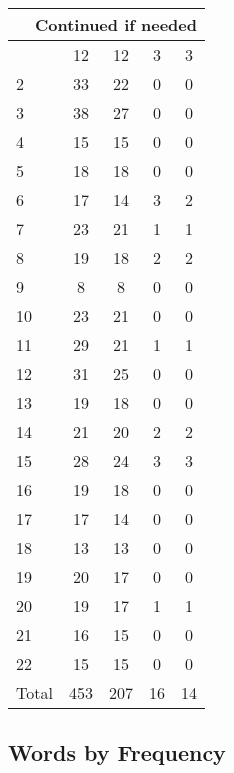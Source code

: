 \begin{center}
\begin{longtable}{l|c|c|c|c}
\hline \multicolumn{5}{|r|}{{Continued if needed}} \\ \hline
\endfoot 
1 & 12 & 12 & 3 & 3\\ \hline
2 & 33 & 22 & 0 & 0\\ \hline
3 & 38 & 27 & 0 & 0\\ \hline
4 & 15 & 15 & 0 & 0\\ \hline
5 & 18 & 18 & 0 & 0\\ \hline
6 & 17 & 14 & 3 & 2\\ \hline
7 & 23 & 21 & 1 & 1\\ \hline
8 & 19 & 18 & 2 & 2\\ \hline
9 & 8 & 8 & 0 & 0\\ \hline
10 & 23 & 21 & 0 & 0\\ \hline
11 & 29 & 21 & 1 & 1\\ \hline
12 & 31 & 25 & 0 & 0\\ \hline
13 & 19 & 18 & 0 & 0\\ \hline
14 & 21 & 20 & 2 & 2\\ \hline
15 & 28 & 24 & 3 & 3\\ \hline
16 & 19 & 18 & 0 & 0\\ \hline
17 & 17 & 14 & 0 & 0\\ \hline
18 & 13 & 13 & 0 & 0\\ \hline
19 & 20 & 17 & 0 & 0\\ \hline
20 & 19 & 17 & 1 & 1\\ \hline
21 & 16 & 15 & 0 & 0\\ \hline
22 & 15 & 15 & 0 & 0\\ \hline
\hline \hline
Total & 453 & 207 & 16 & 14




\end{longtable}
\end{center}



\subsection{Words by Frequency}

